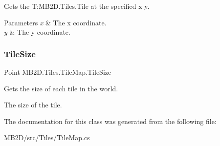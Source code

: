 Gets the T\+:\+M\+B2\+D.\+Tiles.\+Tile at the specified x y. 


\begin{DoxyParams}{Parameters}
{\em x} & The x coordinate.\\
\hline
{\em y} & The y coordinate.\\
\hline
\end{DoxyParams}
\hypertarget{class_m_b2_d_1_1_tiles_1_1_tile_map_a8bdd9b00d7aaba26f9078d3f32438169}{}\label{class_m_b2_d_1_1_tiles_1_1_tile_map_a8bdd9b00d7aaba26f9078d3f32438169} 
\subsubsection{\texorpdfstring{Tile\+Size}{TileSize}}
{\footnotesize\ttfamily Point M\+B2\+D.\+Tiles.\+Tile\+Map.\+Tile\+Size\hspace{0.3cm}{\ttfamily [get]}}



Gets the size of each tile in the world. 

The size of the tile.

The documentation for this class was generated from the following file\+:\begin{DoxyCompactItemize}
\item 
M\+B2\+D/src/\+Tiles/Tile\+Map.\+cs\end{DoxyCompactItemize}
